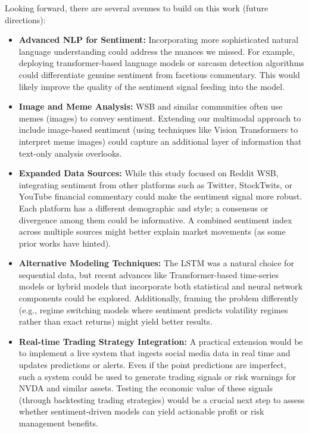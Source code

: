 \documentclass[conference]{IEEEtran}
\begin{document}
Looking forward, there are several avenues to build on this work (future directions):
\begin{itemize}
	\item \textbf{Advanced NLP for Sentiment:} Incorporating more sophisticated natural language understanding could address the nuances we missed. For example, deploying transformer-based language models or sarcasm detection algorithms could differentiate genuine sentiment from facetious commentary. This would likely improve the quality of the sentiment signal feeding into the model.
	\item \textbf{Image and Meme Analysis:} WSB and similar communities often use memes (images) to convey sentiment. Extending our multimodal approach to include image-based sentiment (using techniques like Vision Transformers to interpret meme images) could capture an additional layer of information that text-only analysis overlooks.
	\item \textbf{Expanded Data Sources:} While this study focused on Reddit WSB, integrating sentiment from other platforms such as Twitter, StockTwits, or YouTube financial commentary could make the sentiment signal more robust. Each platform has a different demographic and style; a consensus or divergence among them could be informative. A combined sentiment index across multiple sources might better explain market movements (as some prior works have hinted).
	\item \textbf{Alternative Modeling Techniques:} The LSTM was a natural choice for sequential data, but recent advances like Transformer-based time-series models or hybrid models that incorporate both statistical and neural network components could be explored. Additionally, framing the problem differently (e.g., regime switching models where sentiment predicts volatility regimes rather than exact returns) might yield better results.
	\item \textbf{Real-time Trading Strategy Integration:} A practical extension would be to implement a live system that ingests social media data in real time and updates predictions or alerts. Even if the point predictions are imperfect, such a system could be used to generate trading signals or risk warnings for NVDA and similar assets. Testing the economic value of these signals (through backtesting trading strategies) would be a crucial next step to assess whether sentiment-driven models can yield actionable profit or risk management benefits.
\end{itemize}
\end{document}
